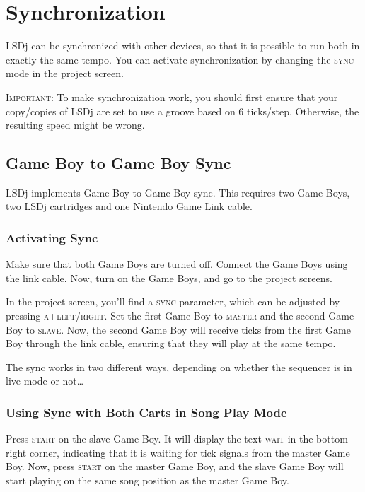 \chapter{Synchronization}
\label{sync-chapter}

LSDj can be synchronized with other devices, so that it is possible to run both in exactly the same tempo. You can activate synchronization by changing the \textsc{sync} mode in the project screen.

\textsc{Important}: To make synchronization work, you should first ensure that your copy/copies of LSDj are set to use a groove based on 6 ticks/step. Otherwise, the resulting speed might be wrong.

\section{Game Boy to Game Boy Sync}

LSDj implements Game Boy to Game Boy sync. This requires two Game Boys, two LSDj cartridges and one Nintendo Game Link cable.

\subsection{Activating Sync}

Make sure that both Game Boys are turned off. Connect the Game Boys using the link cable. Now, turn on the Game Boys, and go to the project screens.

In the project screen, you'll find a \textsc{sync} parameter, which can be adjusted by pressing \textsc{a+left/right}. Set the first Game Boy to \textsc{master} and the second Game Boy to \textsc{slave}. Now, the second Game Boy will receive ticks from the first Game Boy through the link cable, ensuring that they will play at the same tempo.

The sync works in two different ways, depending on whether the sequencer is in live mode or not\ldots

\subsection{Using Sync with Both Carts in Song Play Mode}

Press \textsc{start} on the slave Game Boy. It will display the text \textsc{wait} in the bottom right corner, indicating that it is waiting for tick signals from the master Game Boy. Now, press \textsc{start} on the master Game Boy, and the slave Game Boy will start playing on the same song position as the master Game Boy.

